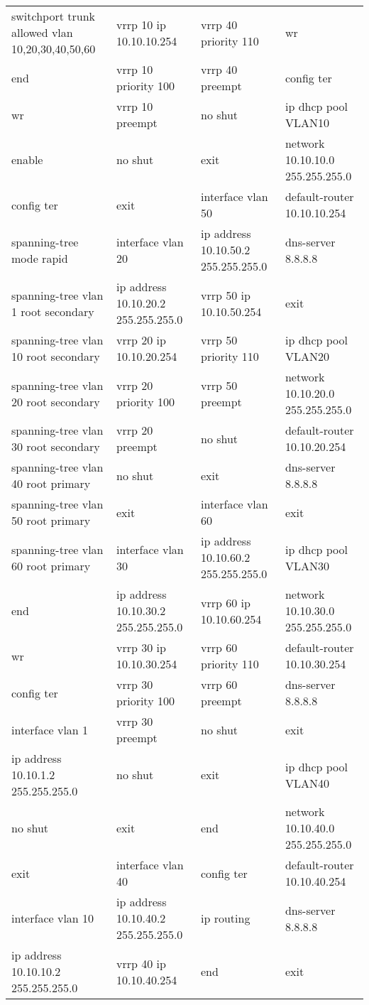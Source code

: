 \begin{table}[H]
\centering
\begin{tabular}{|p{4cm}|p{4cm}|p{4cm}|p{4cm}|}
\hline

switchport trunk allowed vlan 10,20,30,40,50,60	&vrrp 10 ip 10.10.10.254&	vrrp 40 priority 110	&wr\\
end	&vrrp 10 priority 100&	vrrp 40 preempt&	config ter\\
wr&	vrrp 10 preempt&	no shut	&ip dhcp pool VLAN10\\
enable	&no shut&	exit	&network 10.10.10.0 255.255.255.0\\
config ter	&exit&	interface vlan 50&	default-router 10.10.10.254\\
spanning-tree mode rapid&	interface vlan 20&	ip address 10.10.50.2 255.255.255.0	&dns-server 8.8.8.8\\
spanning-tree vlan 1 root secondary&	ip address 10.10.20.2 255.255.255.0	&vrrp 50 ip 10.10.50.254	&exit\\
spanning-tree vlan 10 root secondary	&vrrp 20 ip 10.10.20.254&	vrrp 50 priority 110	&ip dhcp pool VLAN20\\
spanning-tree vlan 20 root secondary&	vrrp 20 priority 100&	vrrp 50 preempt&	network 10.10.20.0 255.255.255.0\\
spanning-tree vlan 30 root secondary&	vrrp 20 preempt	&no shut	&default-router 10.10.20.254\\
spanning-tree vlan 40 root primary&	no shut&	exit	&dns-server 8.8.8.8\\
spanning-tree vlan 50 root primary	&exit&	interface vlan 60	&exit\\
spanning-tree vlan 60 root primary	&interface vlan 30	&ip address 10.10.60.2 255.255.255.0	&ip dhcp pool VLAN30\\
end	&ip address 10.10.30.2 255.255.255.0&	vrrp 60 ip 10.10.60.254	&network 10.10.30.0 255.255.255.0\\
wr	&vrrp 30 ip 10.10.30.254	&vrrp 60 priority 110	&default-router 10.10.30.254\\
config ter&	vrrp 30 priority 100&	vrrp 60 preempt&	dns-server 8.8.8.8\\
interface vlan 1&	vrrp 30 preempt&	no shut&	exit\\
ip address 10.10.1.2 255.255.255.0&	no shut	&exit	&ip dhcp pool VLAN40\\
no shut	&exit&	end	&network 10.10.40.0 255.255.255.0\\
exit&	interface vlan 40&	config ter&	default-router 10.10.40.254\\
interface vlan 10&	ip address 10.10.40.2 255.255.255.0	&ip routing&	dns-server 8.8.8.8\\
ip address 10.10.10.2 255.255.255.0&	vrrp 40 ip 10.10.40.254&	end	&exit\\
\hline
\end{tabular}
\end{table}

